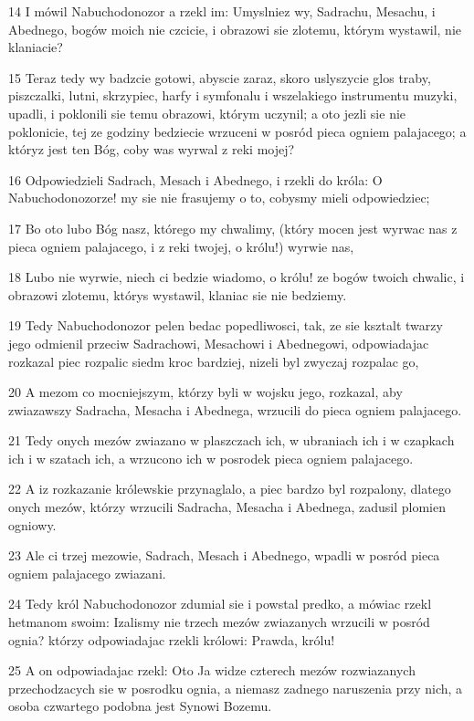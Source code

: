 \par 14 I mówil Nabuchodonozor a rzekl im: Umyslniez wy, Sadrachu, Mesachu, i Abednego, bogów moich nie czcicie, i obrazowi sie zlotemu, którym wystawil, nie klaniacie?
\par 15 Teraz tedy wy badzcie gotowi, abyscie zaraz, skoro uslyszycie glos traby, piszczalki, lutni, skrzypiec, harfy i symfonalu i wszelakiego instrumentu muzyki, upadli, i poklonili sie temu obrazowi, którym uczynil; a oto jezli sie nie poklonicie, tej ze godziny bedziecie wrzuceni w posród pieca ogniem palajacego; a któryz jest ten Bóg, coby was wyrwal z reki mojej?
\par 16 Odpowiedzieli Sadrach, Mesach i Abednego, i rzekli do króla: O Nabuchodonozorze! my sie nie frasujemy o to, cobysmy mieli odpowiedziec;
\par 17 Bo oto lubo Bóg nasz, którego my chwalimy, (który mocen jest wyrwac nas z pieca ogniem palajacego, i z reki twojej, o królu!) wyrwie nas,
\par 18 Lubo nie wyrwie, niech ci bedzie wiadomo, o królu! ze bogów twoich chwalic, i obrazowi zlotemu, którys wystawil, klaniac sie nie bedziemy.
\par 19 Tedy Nabuchodonozor pelen bedac popedliwosci, tak, ze sie ksztalt twarzy jego odmienil przeciw Sadrachowi, Mesachowi i Abednegowi, odpowiadajac rozkazal piec rozpalic siedm kroc bardziej, nizeli byl zwyczaj rozpalac go,
\par 20 A mezom co mocniejszym, którzy byli w wojsku jego, rozkazal, aby zwiazawszy Sadracha, Mesacha i Abednega, wrzucili do pieca ogniem palajacego.
\par 21 Tedy onych mezów zwiazano w plaszczach ich, w ubraniach ich i w czapkach ich i w szatach ich, a wrzucono ich w posrodek pieca ogniem palajacego.
\par 22 A iz rozkazanie królewskie przynaglalo, a piec bardzo byl rozpalony, dlatego onych mezów, którzy wrzucili Sadracha, Mesacha i Abednega, zadusil plomien ogniowy.
\par 23 Ale ci trzej mezowie, Sadrach, Mesach i Abednego, wpadli w posród pieca ogniem palajacego zwiazani.
\par 24 Tedy król Nabuchodonozor zdumial sie i powstal predko, a mówiac rzekl hetmanom swoim: Izalismy nie trzech mezów zwiazanych wrzucili w posród ognia? którzy odpowiadajac rzekli królowi: Prawda, królu!
\par 25 A on odpowiadajac rzekl: Oto Ja widze czterech mezów rozwiazanych przechodzacych sie w posrodku ognia, a niemasz zadnego naruszenia przy nich, a osoba czwartego podobna jest Synowi Bozemu.
